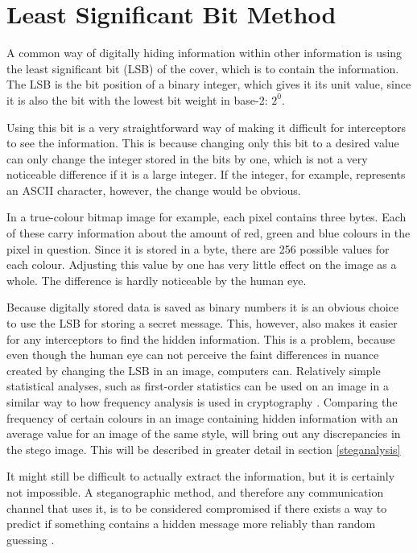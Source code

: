 \section{Least Significant Bit Method}
A common way of digitally hiding information within other information is using the least significant bit (LSB) of the cover, which is to contain the information.
The LSB is the bit position of a binary integer, which gives it its unit value, since it is also the bit with the lowest bit weight in base-2: $2^0$.

Using this bit is a very straightforward way of making it difficult for interceptors to see the information. This is because changing only this bit to a desired value can only change the integer stored in the bits by one, which is not a very noticeable difference if it is a large integer. If the integer, for example, represents an ASCII character, however, the change would be obvious.

In a true-colour bitmap image for example, each pixel contains three bytes. Each of these carry information about the amount of red, green and blue colours in the pixel in question.
Since it is stored in a byte, there are 256 possible values for each colour. Adjusting this value by one has very little effect on the image as a whole. The difference is hardly noticeable by the human eye.

Because digitally stored data is saved as binary numbers it is an obvious choice to use the LSB for storing a secret message. This, however, also makes it easier for any interceptors to find the hidden information.
This is a problem, because even though the human eye can not perceive the faint differences in nuance created by changing the LSB in an image, computers can. 
Relatively simple statistical analyses, such as first-order statistics can be used on an image in a similar way to how frequency analysis is used in cryptography \citep{Hetzl2005}. 
Comparing the frequency of certain colours in an image containing hidden information with an average value for an image of the same style, will bring out any discrepancies in the stego image. This will be described in greater detail in section \ref{steganalysis}

It might still be difficult to actually extract the information, but it is certainly not impossible. A steganographic method, and therefore any communication channel that uses it, is to be considered compromised if there exists a way to predict if something contains a hidden message more reliably than random guessing \citep{Bohme2004}.